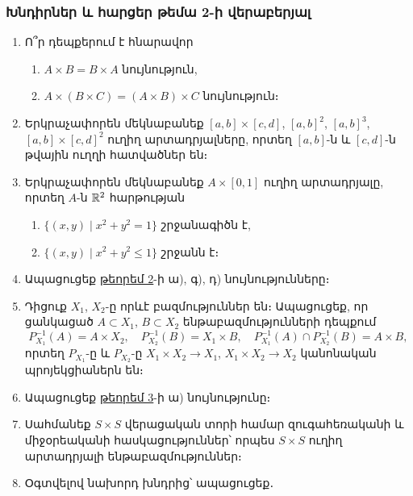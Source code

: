 \bigskip
\bigskip
\subsubsection*{Խնդիրներ և հարցեր թեմա 2-ի վերաբերյալ}

\begin{enumerate}[label=\thesection.\arabic*.]
\item  Ո՞ր դեպքերում է հնարավոր
\begin{enumerate}
    \item[ա)] $A \times B = B \times A$ նույնություն,
    \item[բ)] $A\times(B \times C) = (A \times B) \times C$ նույնություն։
\end{enumerate}

\item  Երկրաչափորեն մեկնաբանեք $[a,b]\times[c,d]$, $[a,b]^2$, $[a,b]^3$, $[a,b]\times[c,d]^2$ ուղիղ արտադրյալները, որտեղ $[a,b]$-ն և $[c,d]$-ն թվային ուղղի հատվածներ են։

\item  Երկրաչափորեն մեկնաբանեք $A\times[0,1]$ ուղիղ արտադրյալը, որտեղ $A$-ն $\mathbb{R}^2$ հարթության
\begin{enumerate}
    \item[ա)] $\{(x,y)\mid x^2+y^2=1\}$ շրջանագիծն է,
    \item[բ)] $\{(x,y)\mid x^2+y^2 \le 1\}$ շրջանն է։
\end{enumerate}

\item  Ապացուցեք \hyperref[ch2thm2]{թեորեմ 2}-ի ա), գ), դ) նույնությունները։

\item  Դիցուք $X_1$, $X_2$-ը որևէ բազմություններ են։ Ապացուցեք, որ ցանկացած \linebreak $A \subset X_1$, $B \subset X_2$ ենթաբազմությունների դեպքում
\[
P_{X_1}^{-1}(A) = A\times X_2,
\quad
P_{X_2}^{-1}(B) = X_1\times B,
\quad
P_{X_1}^{-1}(A) \cap P_{X_2}^{-1}(B) = A\times B,
\]
որտեղ $P_{X_1}$-ը և $P_{X_2}$-ը $X_1\times X_2 \rightarrow X_1$, $X_1\times X_2 \rightarrow X_2$ կանոնական պրոյեկցիա\-ներն են։ 

\item  Ապացուցեք \hyperref[ch2thm3]{թեորեմ 3}-ի ա) նույնությունը։

\item  Սահմանեք $S \times S$ վերացական տորի համար զուգահեռականի և միջօրեականի հասկացություններ՝ որպես $S \times S$ ուղիղ արտադրյալի ենթաբազմություններ։

\item  Օգտվելով նախորդ խնդրից՝ ապացուցեք․


\end{enumerate}
